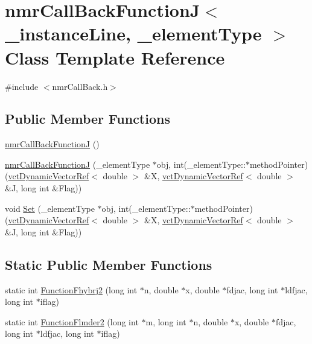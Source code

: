 \hypertarget{classnmr_call_back_function_j}{\section{nmr\-Call\-Back\-Function\-J$<$ \-\_\-instance\-Line, \-\_\-element\-Type $>$ Class Template Reference}
\label{classnmr_call_back_function_j}
}


{\ttfamily \#include $<$nmr\-Call\-Back.\-h$>$}

\subsection*{Public Member Functions}
\begin{DoxyCompactItemize}
\item 
\hyperlink{classnmr_call_back_function_j_a935a12ef94208ca1d3477fdc0641e787}{nmr\-Call\-Back\-Function\-J} ()
\item 
\hyperlink{classnmr_call_back_function_j_acfaac5bff2385305e86e38f283b817ea}{nmr\-Call\-Back\-Function\-J} (\-\_\-element\-Type $\ast$obj, int(\-\_\-element\-Type\-::$\ast$method\-Pointer)(\hyperlink{classvct_dynamic_vector_ref}{vct\-Dynamic\-Vector\-Ref}$<$ double $>$ \&X, \hyperlink{classvct_dynamic_vector_ref}{vct\-Dynamic\-Vector\-Ref}$<$ double $>$ \&J, long int \&Flag))
\item 
void \hyperlink{classnmr_call_back_function_j_ab11fa256ca6faac63f6926e19a597737}{Set} (\-\_\-element\-Type $\ast$obj, int(\-\_\-element\-Type\-::$\ast$method\-Pointer)(\hyperlink{classvct_dynamic_vector_ref}{vct\-Dynamic\-Vector\-Ref}$<$ double $>$ \&X, \hyperlink{classvct_dynamic_vector_ref}{vct\-Dynamic\-Vector\-Ref}$<$ double $>$ \&J, long int \&Flag))
\end{DoxyCompactItemize}
\subsection*{Static Public Member Functions}
\begin{DoxyCompactItemize}
\item 
static int \hyperlink{classnmr_call_back_function_j_a6799a87a71430f4ef46eb065763930cc}{Function\-Fhybrj2} (long int $\ast$n, double $\ast$x, double $\ast$fdjac, long int $\ast$ldfjac, long int $\ast$iflag)
\item 
static int \hyperlink{classnmr_call_back_function_j_ad1165c6db8769ebdaf8cd414dd33f2c8}{Function\-Flmder2} (long int $\ast$m, long int $\ast$n, double $\ast$x, double $\ast$fdjac, long int $\ast$ldfjac, long int $\ast$iflag)
\end{DoxyCompactItemize}
